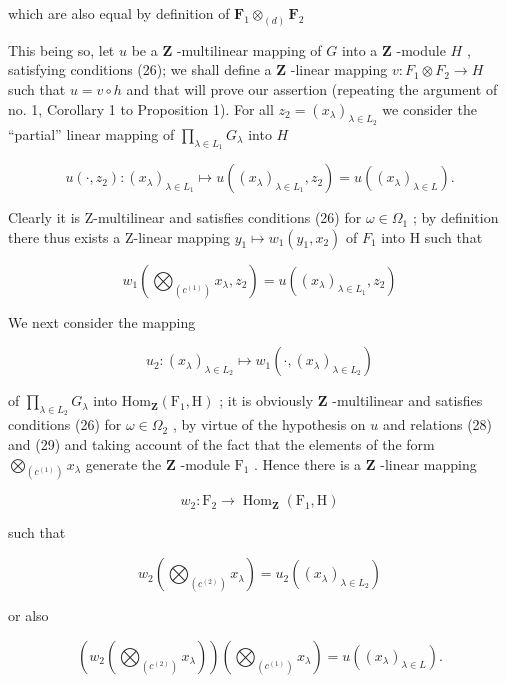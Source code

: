 which are also equal by definition of \(\mathbf{F}_1\otimes_{(d)}\mathbf{F}_2\)

This being so, let \(u\) be a \(\mathbf{Z}\) -multilinear mapping of \(G\) into a \(\mathbf{Z}\) -module \(H\) , satisfying conditions (26); we shall define a \(\mathbf{Z}\) -linear mapping \(v: F_1 \otimes F_2 \to H\) such that \(u = v \circ h\) and that will prove our assertion (repeating the argument of no. 1, Corollary 1 to Proposition 1). For all \(z_2 = (x_\lambda)_{\lambda \in L_2}\) we consider the ``partial'' linear mapping of \(\prod_{\lambda \in L_1} G_\lambda\) into \(H\)

\[
u \left(\cdot , z _ {2}\right): \left(x _ {\lambda}\right) _ {\lambda \in L _ {1}} \mapsto u \left(\left(x _ {\lambda}\right) _ {\lambda \in L _ {1}}, z _ {2}\right) = u \left(\left(x _ {\lambda}\right) _ {\lambda \in L}\right).\tag{28}
\]

Clearly it is Z-multilinear and satisfies conditions (26) for \(\omega\in\Omega_{1}\) ; by definition there thus exists a Z-linear mapping \(y_{1}\mapsto w_{1}(y_{1},x_{2})\) of \(F_{1}\) into H such that

\[
w _ {1} \left(\bigotimes_ {(c ^ {(1)})} x _ {\lambda}, z _ {2}\right) = u \left(\left(x _ {\lambda}\right) _ {\lambda \in L _ {1}}, z _ {2}\right)\tag{29}
\]

We next consider the mapping

\[
u _ {2}: (x _ {\lambda}) _ {\lambda \in L _ {2}} \mapsto w _ {1} (\cdot , (x _ {\lambda}) _ {\lambda \in L _ {2}})
\]

of \(\prod_{\lambda \in L_2} G_\lambda\) into \(\mathrm{Hom}_{\mathbf{Z}}(\mathrm{F}_1, \mathrm{H})\) ; it is obviously \(\mathbf{Z}\) -multilinear and satisfies conditions (26) for \(\omega \in \Omega_2\) , by virtue of the hypothesis on \(u\) and relations (28) and (29) and taking account of the fact that the elements of the form \(\bigotimes_{(c^{(1)})} x_\lambda\) generate the \(\mathbf{Z}\) -module \(\mathrm{F}_1\) . Hence there is a \(\mathbf{Z}\) -linear mapping

\[
w _ {2}: \mathrm{F} _ {2} \rightarrow \operatorname{Hom} _ {\mathbf {Z}} (\mathrm{F} _ {1}, \mathrm{H})
\]

such that

\[
w _ {2} \left(\bigotimes_ {(c ^ {(2)})} x _ {\lambda}\right) = u _ {2} \left(\left(x _ {\lambda}\right) _ {\lambda \in L _ {2}}\right)
\]

or also

\[
\left(w _ {2} \left(\bigotimes_ {(c ^ {(2)})} x _ {\lambda}\right)\right) \left(\bigotimes_ {(c ^ {(1)})} x _ {\lambda}\right) = u \left(\left(x _ {\lambda}\right) _ {\lambda \in L}\right).\tag{30}
\]

